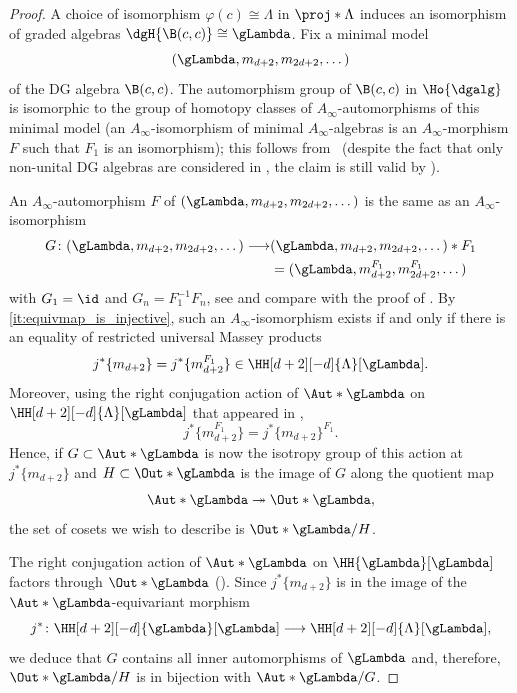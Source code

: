 \documentclass[a4paper]{amsart}
\begin{document}
\begin{proof}
  A choice of isomorphism $\varphi(c)\cong\Lambda$ in $\proj*{\Lambda}$ induces
  an isomorphism of graded algebras $\dgH{\B(c,c)}\cong\gLambda$. Fix
  a minimal model
  \[
    (\gLambda,m_{d+2},m_{2d+2},\dots)
  \]
  of the DG algebra $\B(c,c)$. The automorphism group of $\B(c,c)$ in
  $\Ho{\dgalg}$ is isomorphic to the group of homotopy classes of
  $A_\infty$-automorphisms of this minimal model (an $A_\infty$-isomorphism of
  minimal $A_\infty$-algebras is an $A_\infty$-morphism $F$ such that $F_1$ is
  an isomorphism); this follows from~\cite[Cor.~1.3.1.3]{Lef03} (despite the
  fact that only non-unital DG algebras are considered in \cite{Lef03}, the
  claim is still valid by \cite[Prop.~6.2]{Mur14}).

  An $A_\infty$-automorphism $F$ of $(\gLambda,m_{d+2},m_{2d+2},\dots)$ is the same as an $A_\infty$-isomorphism
  \begin{align*}
    G\colon (\gLambda,m_{d+2},m_{2d+2},\dots) \longrightarrow &(\gLambda,m_{d+2},m_{2d+2},\dots)*F_1\\
    &=(\gLambda,m_{d+2}^{F_1},m_{2d+2}^{F_1},\dots)
  \end{align*}
  with $G_1=\id$ and $G_n=F_1^{-1}F_n$, see  and compare with
  the proof of .  
  By \eqref{it:equivmap_is_injective}, such an
  $A_\infty$-isomorphism exists if and only if there is an equality of
  restricted universal Massey products
  \begin{equation*}
    j^*\{m_{d+2}\}=j^*\{m_{d+2}^{F_1}\}\in\HH[d+2][-d]{\Lambda}[\gLambda].
  \end{equation*}
  Moreover, using the right conjugation action of $\Aut*{\gLambda}$ on $\HH[d+2][-d]{\Lambda}[\gLambda]$ that appeared in , 
  \[j^*\{m_{d+2}^{F_1}\}=j^*\{m_{d+2}\}^{F_1}.\]
  Hence, if $G\subset \Aut*{\gLambda}$ is now the isotropy group of this action at
  $j^*\{m_{d+2}\}$ and $H\subset \Out*{\gLambda}$ is the image of $G$ along the
  quotient map
  \[
    \Aut*{\gLambda}\twoheadrightarrow\Out*{\gLambda},
  \]
  the set of cosets we
  wish to describe is $\Out*{\gLambda}/H$.

  The right conjugation action of $\Aut*{\gLambda}$ on $\HH{\gLambda}[\gLambda]$
  factors through $\Out*{\gLambda}$ ().
  Since $j^*\{m_{d+2}\}$ is in the image of the $\Aut*{\gLambda}$-equivariant
  morphism
  \[
    j^*\colon\HH[d+2][-d]{\gLambda}[\gLambda]\longrightarrow\HH[d+2][-d]{\Lambda}[\gLambda],
  \]
  we deduce that $G$ contains all inner automorphisms of $\gLambda$ and, therefore, $\Out*{\gLambda}/H$ is in bijection with $\Aut*{\gLambda}/G$. 


\end{proof}
\end{document}
